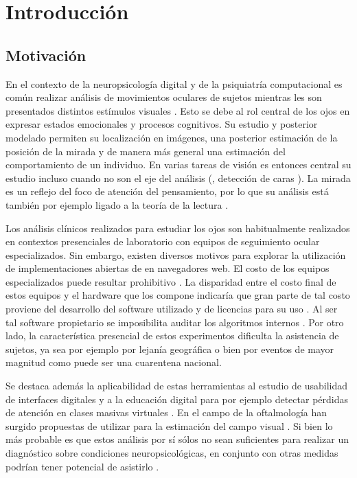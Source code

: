 \chapter{Introducción}

\section{Motivación}

En el contexto de la neuropsicología digital y de la psiquiatría computacional
es común realizar análisis de movimientos oculares de sujetos mientras les son
presentados distintos estímulos visuales \cite{munoz_2004_look_away,
clifton_2016_eye_movements_in_reading}.
Esto se debe al rol central de los ojos en expresar estados emocionales
y procesos cognitivos.
Su estudio y posterior modelado permiten su localización en imágenes, una
posterior estimación de la posición de la mirada y de manera más general una
estimación del comportamiento de un individuo.
En varias tareas de visión es entonces central su estudio incluso cuando no son
el eje del análisis (\eg, detección de caras
\cite{hansen_2009_eye_of_the_beholder}).
La mirada es un reflejo del foco de atención del pensamiento, por lo que su
análisis está también por ejemplo ligado a la teoría de la lectura
\cite{just_1980_theory_of_reading}.

Los análisis clínicos realizados para estudiar los ojos son habitualmente
realizados en contextos presenciales de laboratorio con equipos de seguimiento
ocular especializados.
Sin embargo, existen diversos motivos para explorar la utilización de
implementaciones abiertas de \eyetrackers en navegadores web.
El costo de los equipos especializados puede resultar prohibitivo
\cite{zandi_2021_pupilext}.
La disparidad entre el costo final de estos equipos y el hardware que los
compone indicaría que gran parte de tal costo proviene del desarrollo del software
utilizado y de licencias para su uso \cite{zandi_2021_pupilext,
xu_2015_turker_gaze}.
Al ser tal software propietario se imposibilita auditar los algoritmos internos
\cite{zandi_2021_pupilext}.
Por otro lado, la característica presencial de estos experimentos dificulta la
asistencia de sujetos, ya sea por ejemplo por lejanía geográfica o bien por
eventos de mayor magnitud como puede ser una cuarentena nacional.

Se destaca además la aplicabilidad de estas herramientas al estudio de
usabilidad de interfaces digitales \cite{papoutsaki_2017_search_gazer} y a la
educación digital para por ejemplo detectar pérdidas de atención en clases
masivas virtuales \cite{zhao_2017_mind_wandering}.
En el campo de la oftalmología han surgido propuestas de utilizar \eyetracking
para la estimación del campo visual
\cite{leitner_2021_eyetracking_based_visual_field,
murray_2009_children_perimetry_using_eye_tracking}.
Si bien lo más probable es que estos análisis por sí sólos no sean suficientes
para realizar un diagnóstico sobre condiciones neuropsicológicas, en conjunto
con otras medidas podrían tener potencial de asistirlo
\cite{clark_2019_eye_tracking_potential_in_ophtalmology}.

